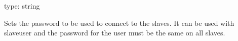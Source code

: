 \documentclass[letterpaper,10pt,english]{sphinxmanual}
\begin{document}
\begin{fulllineitems}
\label{\detokenize{mariadb-schema-change:cmdoption-mariadb-schema-change-slave-password}}
type: string

Sets the password to be used to connect to the slaves.
It can be used with \textendash{}slave\sphinxhyphen{}user and the password for the user must be the same
on all slaves.

\end{fulllineitems}

\end{document}
